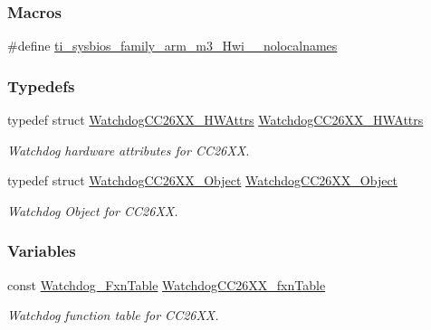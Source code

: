 \subsubsection*{Macros}
\begin{DoxyCompactItemize}
\item 
\#define \hyperlink{_watchdog_c_c26_x_x_8h_aaa17ecf48f5762e2e1bdb0bab8aacf0c}{ti\+\_\+sysbios\+\_\+family\+\_\+arm\+\_\+m3\+\_\+\+Hwi\+\_\+\+\_\+nolocalnames}
\end{DoxyCompactItemize}
\subsubsection*{Typedefs}
\begin{DoxyCompactItemize}
\item 
typedef struct \hyperlink{struct_watchdog_c_c26_x_x___h_w_attrs}{Watchdog\+C\+C26\+X\+X\+\_\+\+H\+W\+Attrs} \hyperlink{_watchdog_c_c26_x_x_8h_a3c5c1fb8e79e0ffbefbc0c6077490157}{Watchdog\+C\+C26\+X\+X\+\_\+\+H\+W\+Attrs}
\begin{DoxyCompactList}\small\item\em Watchdog hardware attributes for C\+C26\+X\+X. \end{DoxyCompactList}\item 
typedef struct \hyperlink{struct_watchdog_c_c26_x_x___object}{Watchdog\+C\+C26\+X\+X\+\_\+\+Object} \hyperlink{_watchdog_c_c26_x_x_8h_a1974637ff573d5fb1e141f263ac5361f}{Watchdog\+C\+C26\+X\+X\+\_\+\+Object}
\begin{DoxyCompactList}\small\item\em Watchdog Object for C\+C26\+X\+X. \end{DoxyCompactList}\end{DoxyCompactItemize}
\subsubsection*{Variables}
\begin{DoxyCompactItemize}
\item 
const \hyperlink{struct_watchdog___fxn_table}{Watchdog\+\_\+\+Fxn\+Table} \hyperlink{_watchdog_c_c26_x_x_8h_a1f60b940055d37c5bf8545499e948ca3}{Watchdog\+C\+C26\+X\+X\+\_\+fxn\+Table}
\begin{DoxyCompactList}\small\item\em Watchdog function table for C\+C26\+X\+X. \end{DoxyCompactList}\end{DoxyCompactItemize}


